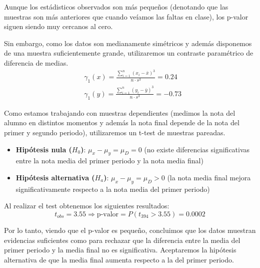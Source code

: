 Aunque los estádisticos observados son más pequeños (denotando que las muestras son más anteriores que cuando veíamos las faltas en clase), los p-valor siguen siendo muy cercanos al cero.

\pagebreak

Sin embargo, como los datos son medianamente simétricos y además disponemos de una muestra suficientemente grande, utilizaremos un contraste paramétrico de diferencia de medias.
\begin{equation*}
    \begin{split}
        & \gamma_{1}(x) = \frac{\sum_{i=1}^{n}(x_i - \bar{x})^3}{n \cdot s^3} = 0.24\\
        & \gamma_{1}(y) = \frac{\sum_{i=1}^{n}(y_i - \bar{y})^3}{n \cdot s^3} = -0.73
    \end{split} 
\end{equation*}

Como estamos trabajando con muestras dependientes (medimos la nota del alumno en distintos momentos y además la nota final depende de la nota del primer y segundo periodo), utilizaremos un t-test de muestras pareadas.
\begin{itemize}
    \item \textbf{Hipótesis nula ($H_0$)}: $\mu_x - \mu_y = \mu_D = 0$ (no existe diferencias significativas entre la nota media del primer periodo y la nota media final)
    \item \textbf{Hipótesis alternativa ($H_a$)}: $\mu_x - \mu_y = \mu_D > 0$ (la nota media final mejora significativamente respecto a la nota media del primer periodo)
\end{itemize}

Al realizar el test obtenemos los siguientes resultados:
\begin{equation*}
    t_{obs} = 3.55 \Rightarrow \text{p-valor} = P(t_{394} > 3.55) = 0.0002
\end{equation*}

Por lo tanto, viendo que el p-valor es pequeño, concluimos que los datos muestran evidencias suficientes como para rechazar que la diferencia entre la media del primer periodo y la media final no es significativa. Aceptaremos la hipótesis alternativa de que la media final aumenta respecto a la del primer periodo.
